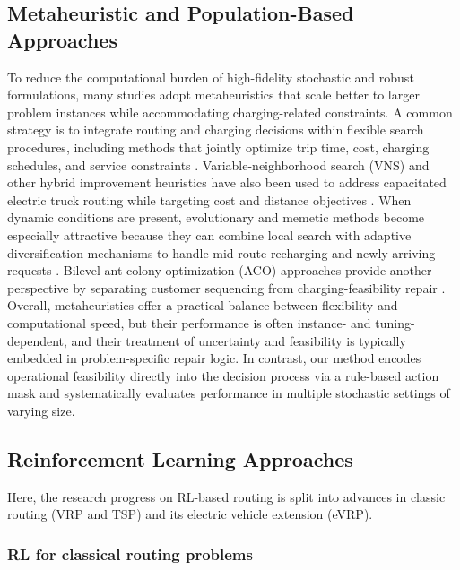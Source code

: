 \documentclass[journal]{IEEEtran}
\begin{document}
\subsection{Metaheuristic and Population-Based Approaches}

To reduce the computational burden of high-fidelity stochastic and robust formulations, many studies adopt metaheuristics that scale better to larger problem instances while accommodating charging-related constraints. A common strategy is to integrate routing and charging decisions within flexible search procedures, including methods that jointly optimize trip time, cost, charging schedules, and service constraints \citep{https://doi.org/10.1049/pel2.12555}. Variable-neighborhood search (VNS) and other hybrid improvement heuristics have also been used to address capacitated electric truck routing while targeting cost and distance objectives \citep{euchi_hybrid_2023}. When dynamic conditions are present, evolutionary and memetic methods become especially attractive because they can combine local search with adaptive diversification mechanisms to handle mid-route recharging and newly arriving requests \citep{dong_dynamic_2023,https://doi.org/10.1155/2021/6635749}. Bilevel ant-colony optimization (ACO) approaches provide another perspective by separating customer sequencing from charging-feasibility repair \citep{9409782}. 
Overall, metaheuristics offer a practical balance between flexibility and computational speed, but their performance is often instance- and tuning-dependent, and their treatment of uncertainty and feasibility is typically embedded in problem-specific repair logic. In contrast, our method encodes operational feasibility directly into the decision process via a rule-based action mask and systematically evaluates performance in multiple stochastic settings of varying size.

\subsection{Reinforcement Learning Approaches}

Here, the research progress on RL-based routing is split into advances in classic routing (VRP and TSP) and its electric vehicle extension (eVRP).

\subsubsection{RL for classical routing problems}
\end{document}
